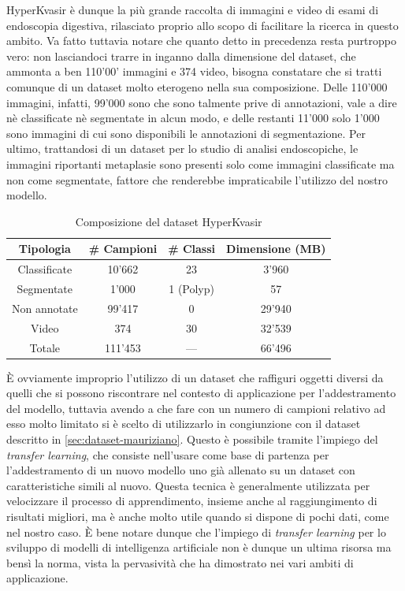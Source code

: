 HyperKvasir è dunque la più grande raccolta di immagini
e video di esami di endoscopia digestiva, rilasciato proprio
allo scopo di facilitare la ricerca in questo ambito.
Va fatto tuttavia notare che quanto detto in precedenza resta
purtroppo vero:
non lasciandoci trarre in inganno dalla dimensione del dataset,
che ammonta a ben 110'00' immagini e 374 video, bisogna
constatare che si tratti comunque di un dataset molto
eterogeno nella sua composizione.
Delle 110'000 immagini, infatti, 99'000 sono che sono
talmente prive di annotazioni, vale a dire nè classificate
nè segmentate in alcun modo, e delle restanti 11'000
solo 1'000 sono immagini di cui sono disponibili
le annotazioni di segmentazione.
Per ultimo, trattandosi di un dataset per lo studio
di analisi endoscopiche, le immagini riportanti metaplasie
sono presenti solo come immagini classificate ma non come
segmentate, fattore che renderebbe impraticabile
l'utilizzo del nostro modello.

\begin{table}
    \center
    \begin{tabular}{||c|c|c|c||}
        \hline
        Tipologia & \# Campioni & \# Classi & Dimensione (MB) \\
        \hline
        \hline
        Classificate & 10'662 & 23 & 3'960 \\
        \hline
        Segmentate & 1'000 & 1 (Polyp) & 57 \\
        \hline
        Non annotate & 99'417 & 0 & 29'940 \\
        \hline
        Video & 374 & 30 & 32'539 \\
        \hline
        \hline
        Totale & 111'453 & --- & 66'496 \\
        \hline
    \end{tabular}
    \caption{\label{tab:hyperkvasir}Composizione del dataset HyperKvasir}
\end{table}

È ovviamente improprio l'utilizzo di un dataset che raffiguri
oggetti diversi da quelli che si possono riscontrare nel 
contesto di applicazione per l'addestramento del modello,
tuttavia avendo a che fare con un numero di campioni
relativo ad esso molto limitato si è scelto di utilizzarlo
in congiunzione con il dataset descritto in \ref{sec:dataset-mauriziano}.
Questo è possibile tramite l'impiego del {\it transfer learning},
che consiste nell'usare come base di partenza per l'addestramento
di un nuovo modello uno già allenato su un dataset con
caratteristiche simili al nuovo.
Questa tecnica è generalmente utilizzata per velocizzare
il processo di apprendimento, insieme anche al raggiungimento
di risultati migliori, ma è anche molto utile quando si 
dispone di pochi dati, come nel nostro caso.
È bene notare dunque che l'impiego di {\it transfer learning}
per lo sviluppo di modelli di intelligenza artificiale non è
dunque un ultima risorsa ma bensì la norma, vista la
pervasività che ha dimostrato nei vari ambiti di applicazione.

